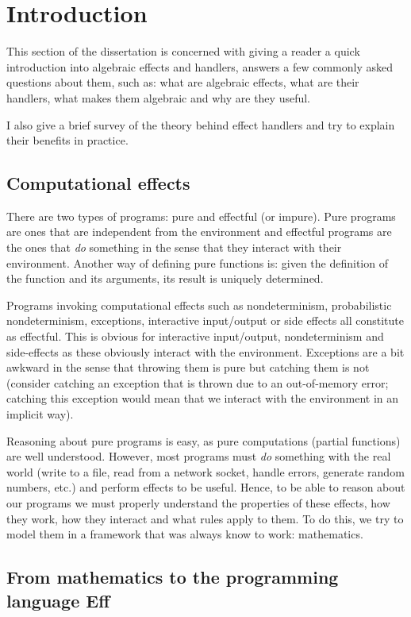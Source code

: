 \documentclass[class=article,crop=false,11pt]{standalone}
\begin{document}
\section{Introduction}

This section of the dissertation is concerned with giving a reader a quick introduction into
algebraic effects and handlers, answers a few commonly asked questions about them, such as:
what are algebraic effects, what are their handlers, what makes them algebraic and why are they useful.

I also give a brief survey of the theory behind effect handlers and try to explain their benefits in practice.

\subsection{Computational effects}


There are two types of programs: pure and effectful (or impure). Pure programs are ones that are independent from the environment and effectful programs are the ones that \emph{do} something in the
sense that they interact with their environment. Another way of defining pure functions is: given the definition of the function and its arguments, its result is uniquely determined.

Programs invoking computational effects such as nondeterminism, probabilistic nondeterminism, exceptions, interactive input/output or side effects all constitute as effectful. This is obvious for
interactive input/output, nondeterminism and side-effects as these obviously interact with the environment. Exceptions are a bit awkward in the sense that throwing them is pure but catching them is
not (consider catching an exception that is thrown due to an out-of-memory error; catching this exception would mean that we interact with the environment in an implicit way).

Reasoning about pure programs is easy, as pure computations (partial functions) are well understood. However, most programs must \emph{do} something with the real world (write to a file, 
read from a network socket, handle errors, generate random numbers, etc.) and perform effects to be useful.
Hence, to be able to reason about our programs we must properly understand the properties of these effects, how they work, how they interact and what rules apply to them. To do this, we try to model
them in a framework that was always know to work: mathematics.

\subsection{From mathematics to the programming language Eff}
\end{document}
